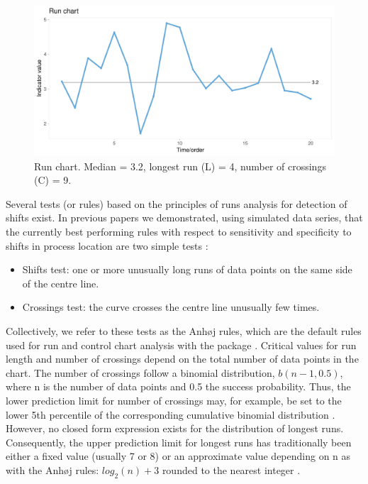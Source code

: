 \begin{figure}[htbp]
  \centering
  \includegraphics[width=\textwidth]{fig_run.pdf}
  \caption{Run chart. Median = 3.2, longest run (L) = 4, number of crossings (C) = 9.}
  \label{figure:run}
\end{figure}

Several tests (or rules) based on the principles of runs analysis for
detection of shifts exist. In previous papers we demonstrated, using
simulated data series, that the currently best performing rules with
respect to sensitivity and specificity to shifts in process location are
two simple tests \citep{anhoej2014, anhoej2015, anhoej2018}:

\begin{itemize}
\item
  Shifts test: one or more unusually long runs of data points on the
  same side of the centre line.
\item
  Crossings test: the curve crosses the centre line unusually few times.
\end{itemize}

Collectively, we refer to these tests as the Anhøj rules, which are the
default rules used for run and control chart analysis with the
 package \citep{qicharts2}. Critical values for run
length and number of crossings depend on the total number of data points
in the chart. The number of crossings follow a binomial distribution,
\(b(n - 1, 0.5)\), where n is the number of data points and 0.5 the
success probability. Thus, the lower prediction limit for number of
crossings may, for example, be set to the lower 5th percentile of the
corresponding cumulative binomial distribution \citep{chen2010}.
However, no closed form expression exists for the distribution of
longest runs. Consequently, the upper prediction limit for longest runs
has traditionally been either a fixed value (usually 7 or 8)
\citep{carey2002a} or an approximate value depending on n as with the
Anhøj rules: \(log_2(n) + 3\) rounded to the nearest integer
\citep{schilling2012}.

